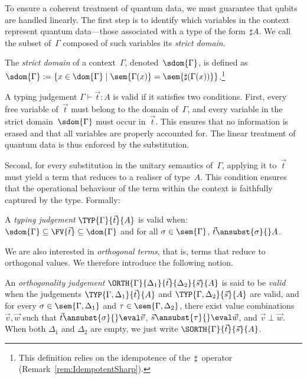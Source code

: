 To ensure a coherent treatment of quantum data, we must guarantee that qubits
are handled linearly. The first step is to identify which variables in the
context represent quantum data---those associated with a type of the
form~$\sharp A$. We call the subset of~$\Gamma$ composed of such variables its
\emph{strict domain}.

\begin{definition}
  The \emph{strict domain} of a context~$\Gamma$, denoted~$\sdom{\Gamma}$, is
  defined as
  \(
    \sdom{\Gamma} :=
    \{x \in \dom{\Gamma} \mid
    \sem{\Gamma(x)} = \sem{\sharp(\Gamma(x))}\}
  \).\footnote{This definition relies on the idempotence of the~$\sharp$~operator (Remark~\ref{rem:IdempotentSharp}).
  }
\end{definition}

A typing judgement $\Gamma\vdash \vec{t}:A$ is valid if it satisfies two
conditions.  First, every free variable of~$\vec{t}$ must belong to the domain
of~$\Gamma$, and every variable in the strict domain~$\sdom{\Gamma}$ must occur
in~$\vec{t}$.  This ensures that no information is erased and that all variables
are properly accounted for.  The linear treatment of quantum data is thus
enforced by the substitution.

Second, for every substitution in the unitary semantics of~$\Gamma$, applying
it to~$\vec{t}$ must yield a term that reduces to a realiser of type~$A$.  This
condition ensures that the operational behaviour of the term within the context
is faithfully captured by the type. Formally:

\begin{definition}
  A \emph{typing judgement} $\TYP{\Gamma}{\vec{t}}{A}$ is valid when:
    $\sdom{\Gamma}\subseteq\FV{\vec{t}}\subseteq\dom{\Gamma}$
    and
    for all $\sigma\in\sem{\Gamma}$, 
          $\vec{t}\ansubst{\sigma}{}\real A$.
\end{definition}

We are also interested in \emph{orthogonal terms}, that is, terms that reduce
to orthogonal values. We therefore introduce the following notion.

\begin{definition}
  An \emph{orthogonality judgement}
  $\ORTH{\Gamma}{\Delta_1}{\vec{t}}{\Delta_2}{\vec{s}}{A}$
  is said to be \emph{valid} when the judgements
      $\TYP{\Gamma,\Delta_1}{\vec{t}}{A}$ and
      $\TYP{\Gamma,\Delta_2}{\vec{s}}{A}$ are valid, and
      for every
      $\sigma\in\sem{\Gamma,\Delta_1}$ and
      $\tau\in\sem{\Gamma,\Delta_2}$,
      there exist value combinations $\vec{v},\vec{w}$ such that
      $\vec{t}\ansubst{\sigma}{}\eval\vec{v}$,
      $\vec{s}\ansubst{\tau}{}\eval\vec{w}$,
      and $\vec{v}\perp\vec{w}$.
When both $\Delta_1$ and $\Delta_2$ are empty,
we just write $\SORTH{\Gamma}{\vec{t}}{\vec{s}}{A}$.
\end{definition}

